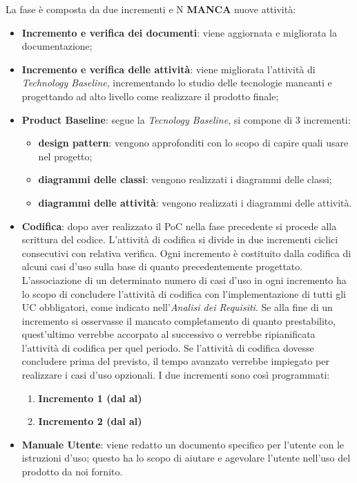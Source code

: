 La fase è composta da due incrementi e N \textbf{MANCA} nuove attività:
\begin{itemize}
\item \textbf{Incremento e verifica dei documenti}: viene aggiornata e migliorata la documentazione;
\item \textbf{Incremento e verifica delle attività}: viene migliorata l’attività di \textit{Technology Baseline},  incrementando lo studio delle tecnologie mancanti e progettando ad alto livello come realizzare il prodotto finale;
\item \textbf{Product Baseline}: segue la \textit{Tecnology Baseline},  si compone di 3 incrementi:
	\begin{itemize}
	\item \textbf{design pattern}: vengono approfonditi con lo scopo di capire quali usare nel progetto;
	\item \textbf{diagrammi delle classi}: vengono realizzati i diagrammi delle classi;
	\item \textbf{diagrammi delle attività}: vengono realizzati i diagrammi delle attività.
	\end{itemize}
\item \textbf{Codifica}: dopo aver realizzato il PoC nella fase precedente si procede alla scrittura del codice.  L'attività di codifica si divide in due incrementi ciclici consecutivi con relativa verifica.  Ogni incremento è costituito dalla codifica di alcuni casi d'uso sulla base di quanto precedentemente progettato.  L’associazione di un determinato numero di casi d’uso in ogni incremento ha lo scopo di concludere l'attività di codifica con l’implementazione di tutti gli UC obbligatori,  come indicato nell'\textit{Analisi dei Requisiti}.  Se alla fine di un incremento si osservasse il mancato completamento di quanto prestabilito,  quest’ultimo verrebbe accorpato al successivo o verrebbe ripianificata l’attività di codifica per quel periodo. Se l'attività di codifica dovesse concludere prima del previsto,  il tempo avanzato verrebbe impiegato per realizzare i casi d'uso opzionali.  I due incrementi sono così programmati:
	\begin{enumerate}
	\item \textbf{Incremento 1 (dal al)}
	\item \textbf{Incremento 2 (dal al)}
	\end{enumerate}
\item \textbf{Manuale Utente}: viene redatto un documento specifico per l'utente con le istruzioni d'uso; questo ha lo scopo di aiutare e agevolare l’utente nell’uso del prodotto da noi fornito.
\end{itemize}
